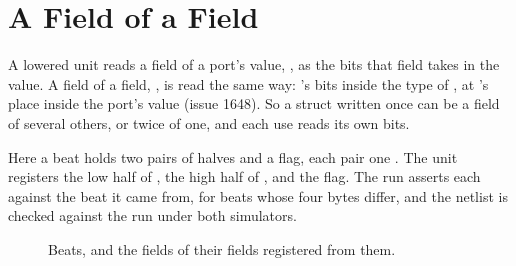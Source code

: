\section{A Field of a Field}
\label{sec:x-subfield}

A lowered unit reads a field of a port's value, ,
as the bits that field takes in the value. A field of a field,
, is read the same way: 's bits inside the
type of , at 's place inside the port's value
(issue 1648). So a struct written once can be a field of several
others, or twice of one, and each use reads its own bits.

Here a beat holds two pairs of halves and a flag, each pair one
. The unit registers the low half of , the high
half of , and the flag. The run asserts each against the beat
it came from, for beats whose four bytes differ, and the netlist is
checked against the run under both simulators.

\begin{figure}[htbp]
\centering

\caption{Beats, and the fields of their fields registered from them.}
\label{fig:x-subfield}
\end{figure}




